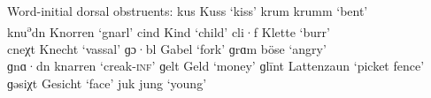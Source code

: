 \ea%
\label{ex:11:4}Word-initial dorsal obstruents:
\ea\label{ex:11:4a} kus \tab [kʊs] \tab  Kuss \tab ‘kiss’ 
\ex\label{ex:11:4b} krum \tab [krʊm] \tab krumm \tab ‘bent’ \\
    knu\textsuperscript{ə}dn \tab [knuədn̩] \tab Knorren \tab ‘gnarl’ 
\ex\label{ex:11:4c} cind \tab [cɪnt] \tab  Kind \tab ‘child’ 
\ex\label{ex:11:4d} cli·f \tab [clif] \tab Klette \tab ‘burr’ \\
    cneχt \tab [cneçt] \tab Knecht \tab ‘vassal’ 
\ex\label{ex:11:4e} ɡɔ·bl \tab [gɔ·bl̩] \tab Gabel \tab ‘fork’ 
\ex\label{ex:11:4f} ɡrɑm \tab [grɑm] \tab böse \tab ‘angry’ \\
    ɡnɑ·dn \tab [gnɑdn̩] \tab knarren \tab ‘creak\textsc{{}-inf}’ 
\ex\label{ex:11:4g} ɡelt \tab  [ɟelt] \tab  Geld \tab ‘money’ 
\ex\label{ex:11:4h} ɡlīnt \tab [ɟliːnt] \tab  Lattenzaun \tab ‘picket fence’ 
\ex\label{ex:11:4i} ɡəsiχt \tab [ɟəsɪçt] \tab  Gesicht \tab  ‘face’ 
\ex\label{ex:11:4j} juk \tab [ʝʊŋk] \tab jung \tab ‘young’ 
    \z
\z 

